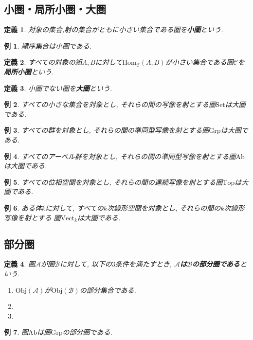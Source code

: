 \documentclass{jsbook}
\theoremstyle{plain}
\newtheorem{Def}{定義}[chapter]
\newtheorem{example}{例}[chapter]
\begin{document}
\subsection{小圏・局所小圏・大圏}
\begin{Def}
対象の集合,射の集合がともに小さい集合である圏を{\bf 小圏}という.
\end{Def}
\begin{example}
順序集合は小圏である.
\end{example}
\begin{Def}
すべての対象の組$A,B$に対して$\mathrm{Hom}_{\mathscr{C}}(A,B)$が小さい集合である圏$\mathscr{C}$を{\bf 局所小圏}という.
\end{Def}
\begin{Def}
小圏でない圏を{\bf 大圏}という.
\end{Def}

\begin{example}
すべての小さな集合を対象とし, それらの間の写像を射とする圏$\mathrm{Set}$は大圏である.
\end{example}
\begin{example}
すべての群を対象とし, それらの間の準同型写像を射とする圏$\mathrm{Grp}$は大圏である.
\end{example}
\begin{example}
すべてのアーベル群を対象とし, それらの間の準同型写像を射とする圏$\mathrm{Ab}$は大圏である.
\end{example}
\begin{example}
すべての位相空間を対象とし, それらの間の連続写像を射とする圏$\mathrm{Top}$は大圏である.
\end{example}
\begin{example}
ある体$k$に対して,
すべての$k$次線形空間を対象とし,
それらの間の$k$次線形写像を射とする
圏$\mathrm{Vect}_k$は大圏である.
\end{example}
\subsection{部分圏}
\begin{Def}
圏$\mathscr{A}$が圏$\mathscr{B}$に対して, 以下の$3$条件を満たすとき, {\bf $\mathscr{A}$は$\mathscr{B}$の部分圏である}という.
\begin{enumerate}
\item $\mathrm{Obj}(\mathscr{A})$が$\mathrm{Obj}(\mathscr{B})$の部分集合である.
\item
\item
\end{enumerate}
\end{Def}
\begin{example}
圏$\mathrm{Ab}$は圏$\mathrm{Grp}$の部分圏である.
\end{example}
\end{document}
